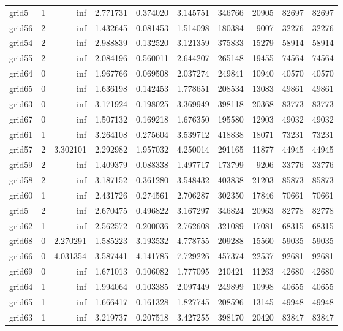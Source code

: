\documentclass[../../../thesis.tex]{subfiles}
\begin{document}
\begin{longtable}{|l|r|r|r|r|r|r|r|r|r|}
grid5 & 1 & inf & 2.771731 & 0.374020 & 3.145751 & 346766 & 20905 & 82697 & 82697 \\
grid56 & 2 & inf & 1.432645 & 0.081453 & 1.514098 & 180384 & 9007 & 32276 & 32276 \\
grid54 & 2 & inf & 2.988839 & 0.132520 & 3.121359 & 375833 & 15279 & 58914 & 58914 \\
grid55 & 2 & inf & 2.084196 & 0.560011 & 2.644207 & 265148 & 19455 & 74564 & 74564 \\
grid64 & 0 & inf & 1.967766 & 0.069508 & 2.037274 & 249841 & 10940 & 40570 & 40570 \\
grid65 & 0 & inf & 1.636198 & 0.142453 & 1.778651 & 208534 & 13083 & 49861 & 49861 \\
grid63 & 0 & inf & 3.171924 & 0.198025 & 3.369949 & 398118 & 20368 & 83773 & 83773 \\
grid67 & 0 & inf & 1.507132 & 0.169218 & 1.676350 & 195580 & 12903 & 49032 & 49032 \\
grid61 & 1 & inf & 3.264108 & 0.275604 & 3.539712 & 418838 & 18071 & 73231 & 73231 \\
grid57 & 2 & 3.302101 & 2.292982 & 1.957032 & 4.250014 & 291165 & 11877 & 44945 & 44945 \\
grid59 & 2 & inf & 1.409379 & 0.088338 & 1.497717 & 173799 & 9206 & 33776 & 33776 \\
grid58 & 2 & inf & 3.187152 & 0.361280 & 3.548432 & 403838 & 21203 & 85873 & 85873 \\
grid60 & 1 & inf & 2.431726 & 0.274561 & 2.706287 & 302350 & 17846 & 70661 & 70661 \\
grid5 & 2 & inf & 2.670475 & 0.496822 & 3.167297 & 346824 & 20963 & 82778 & 82778 \\
grid62 & 1 & inf & 2.562572 & 0.200036 & 2.762608 & 321089 & 17081 & 68315 & 68315 \\
grid68 & 0 & 2.270291 & 1.585223 & 3.193532 & 4.778755 & 209288 & 15560 & 59035 & 59035 \\
grid66 & 0 & 4.031354 & 3.587441 & 4.141785 & 7.729226 & 457374 & 22537 & 92681 & 92681 \\
grid69 & 0 & inf & 1.671013 & 0.106082 & 1.777095 & 210421 & 11263 & 42680 & 42680 \\
grid64 & 1 & inf & 1.994064 & 0.103385 & 2.097449 & 249899 & 10998 & 40655 & 40655 \\
grid65 & 1 & inf & 1.666417 & 0.161328 & 1.827745 & 208596 & 13145 & 49948 & 49948 \\
grid63 & 1 & inf & 3.219737 & 0.207518 & 3.427255 & 398170 & 20420 & 83847 & 83847 \\

\end{longtable}
\end{document}
